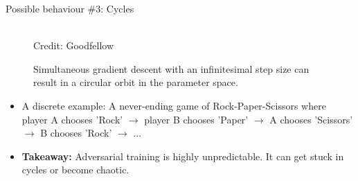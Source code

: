 \begin{frame} {Possible behaviour \#3: Cycles}
  \begin{figure}
    \centering
      \tiny{\\Credit: Goodfellow}
      \caption{\footnotesize Simultaneous gradient descent with an infinitesimal step size can result in a circular orbit in the parameter space.}
  \end{figure}
  \begin{itemize}
    \item A discrete example: A never-ending game of Rock-Paper-Scissors where player A chooses 'Rock' $\rightarrow$ player B chooses 'Paper' $\rightarrow$ A chooses 'Scissors' $\rightarrow$ B chooses 'Rock' $\rightarrow$ ...
   \item  \textbf{Takeaway:} Adversarial training is highly unpredictable. It can get stuck in cycles or become chaotic.
  \end{itemize}
\end{frame}


